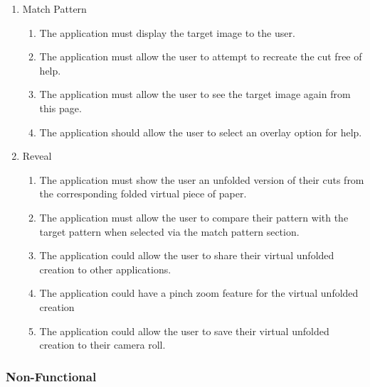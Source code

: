 \documentclass[11pt]{article}
\begin{document}
\begin{enumerate}
      \item Match Pattern
        \begin{enumerate}[label*=\arabic*.]
        \item The application must display the target image to the user.
        \item The application must allow the user to attempt to recreate the cut free of help. 
        \item The application must allow the user to see the target image again from this page. 
        \item The application should allow the user to select an overlay option for help.
      \end{enumerate}

      \item Reveal
        \begin{enumerate}[label*=\arabic*.]
        \item The application must show the user an unfolded version of their cuts from the corresponding folded virtual piece of paper. 
        \item The application must allow the user to compare their pattern with the target pattern when selected via the match pattern section.
        \item The application could allow the user to share their virtual unfolded creation to other applications. 
         \item The application could have a pinch zoom feature for the virtual unfolded creation 
        \item The application could allow the user to save their virtual unfolded creation to their camera roll.
      \end{enumerate}
    \end{enumerate}

    
   \subsubsection{ Non-Functional}
    
\end{document}
